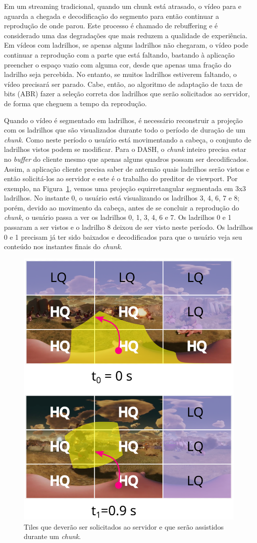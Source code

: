 Em um streaming tradicional, quando um chunk está atrasado, o vídeo para e aguarda a chegada e decodificação do segmento para então continuar a reprodução de onde parou. Este processo é chamado de rebuffering e é considerado uma das degradações que mais reduzem a qualidade de experiência. Em vídeos com ladrilhos, se apenas alguns ladrilhos não chegaram, o vídeo pode continuar a reprodução com a parte que está faltando, bastando à aplicação preencher o espaço vazio com alguma cor, desde que apenas uma fração do ladrilho seja percebida. No entanto, se muitos ladrilhos estiverem faltando, o vídeo precisará ser parado. Cabe, então, ao algoritmo de adaptação de taxa de bits (ABR) fazer a seleção correta dos ladrilhos que serão solicitados ao servidor, de forma que cheguem a tempo da reprodução.

Quando o vídeo é segmentado em ladrilhos, é necessário reconstruir a projeção com os ladrilhos que são visualizados durante todo o período de duração de um \textit{chunk}. Como neste período o usuário está movimentando a cabeça, o conjunto de ladrilhos vistos podem se modificar. Para o DASH, o \textit{chunk} inteiro precisa estar no \textit{buffer} do cliente mesmo que apenas alguns quadros possam ser decodificados. Assim, a aplicação cliente precisa saber de antemão quais ladrilhos serão vistos e então solicitá-los ao servidor e este é o trabalho do preditor de viewport. Por exemplo, na Figura~\ref{fig:selectTiles}, vemos uma projeção equirretangular segmentada em 3x3 ladrilhos. No instante 0, o usuário está visualizando os ladrilhos 3, 4, 6, 7 e 8; porém, devido ao movimento da cabeça, antes de se concluir a reprodução do \textit{chunk}, o usuário passa a ver os ladrilhos 0, 1, 3, 4, 6 e 7. Os ladrilhos 0 e 1 passaram a ser vistos e o ladrilho 8 deixou de ser visto neste período. Os ladrilhos 0 e 1 precisam já ter sido baixados e decodificados para que o usuário veja seu conteúdo nos instantes finais do \textit{chunk}.

\begin{figure}[h]
    \centering
    \includegraphics[width=0.5\linewidth]{fig/Streaming of Tiles 2.png}
    \caption{Tiles que deverão ser solicitados ao servidor e que serão assistidos durante um \textit{chunk}.}
    \label{fig:selectTiles}
\end{figure}

